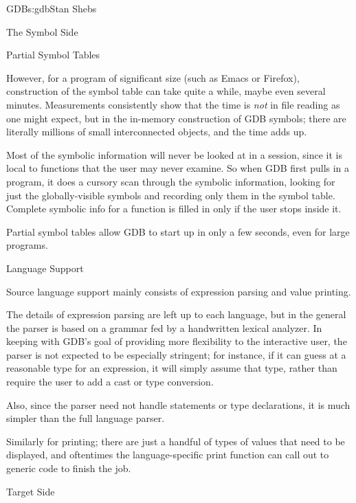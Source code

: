 \begin{aosachapter}{GDB}{s:gdb}{Stan Shebs}
\begin{aosasect1}{The Symbol Side}
\end{aosasect1}

\begin{aosasect2}{Partial Symbol Tables}

However, for a program of significant size (such as Emacs or Firefox),
construction of the symbol table can take quite a while, maybe even
several minutes.  Measurements consistently show that the time is
{\em not} in file reading as one might expect, but in the in-memory
construction of GDB symbols; there are literally millions of small
interconnected objects, and the time adds up.

Most of the symbolic information will never be looked at in a session,
since it is local to functions that the user may never examine.  So
when GDB first pulls in a program, it does a cursory scan through the
symbolic information, looking for just the globally-visible symbols
and recording only them in the symbol table.  Complete symbolic info
for a function is filled in only if the user stops inside it.

Partial symbol tables allow GDB to start up in only a few seconds, even
for large programs.

\end{aosasect2}

\begin{aosasect2}{Language Support}

Source language support mainly consists of expression parsing and value
printing.

The details of expression parsing are left up to each language, but in
the general the parser is based on a  grammar fed by a handwritten
lexical analyzer.  In keeping with GDB's goal of providing more
flexibility to the interactive user, the parser is not expected to be
especially stringent; for instance, if it can guess at a reasonable
type for an expression, it will simply assume that type, rather than
require the user to add a cast or type conversion.

Also, since the parser need not handle statements or type
declarations, it is much simpler than the full language parser.

Similarly for printing; there are just a handful of types of values
that need to be displayed, and oftentimes the language-specific print
function can call out to generic code to finish the job.

\end{aosasect2}

\begin{aosasect1}{Target Side}


\end{aosasect1}
\end{aosachapter}
